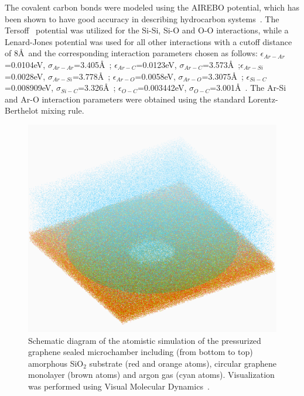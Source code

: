 The covalent carbon bonds were modeled using the AIREBO\cite{stuartJCP2000} potential, which has been shown to have good accuracy in describing hydrocarbon systems~\cite{qiNANO2010,zhaoJAP2010}.
The Tersoff~\cite{tersoffPRB1988} potential was utilized for the Si-Si, Si-O and O-O interactions, while a Lenard-Jones potential was used for all other interactions with a cutoff distance of 8\AA \ and the corresponding interaction parameters chosen as follows: $\epsilon_{Ar-Ar}$=0.0104eV, $\sigma_{Ar-Ar}$=3.405\AA~\cite{RytkonenJchemp1998}; $\epsilon_{Ar-C}$=0.0123eV, $\sigma_{Ar-C}$=3.573\AA~\cite{RobertNano1996};$\epsilon_{Ar-Si}$=0.0028eV, $\sigma_{Ar-Si}$=3.778\AA~\cite{LiPRA2010}; $\epsilon_{Ar-O}$=0.0058eV, $\sigma_{Ar-O}$=3.3075\AA~\cite{EverittJCP1999}; $\epsilon_{Si-C}$=0.008909eV, $\sigma_{Si-C}$=3.326\AA~\cite{OngPRB2010}; $\epsilon_{O-C}$=0.003442eV, $\sigma_{O-C}$=3.001\AA~\cite{OngPRB2010}.
The Ar-Si and Ar-O interaction parameters were obtained using the standard Lorentz-Berthelot mixing rule.

\begin{figure}
	\begin{center}
	\includegraphics[scale=0.15]{Figs_Friction/MD.pdf}
	\end{center}
	\caption[Schematic diagram of the atomistic simulation of the pressurized graphene sealed microchamber]{\label{fig:fri:MD} Schematic diagram of the atomistic simulation of the pressurized graphene sealed microchamber including (from bottom to top) amorphous SiO$_{2}$ substrate (red and orange atoms), circular graphene monolayer (brown atoms) and argon gas (cyan atoms). Visualization was performed using Visual Molecular Dynamics~\cite{Humphrey1996}.}
\end{figure}

